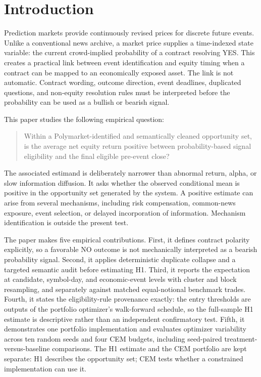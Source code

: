 \documentclass[sigconf,anonymous]{acmart}
\begin{document}
\section{Introduction}

Prediction markets provide continuously revised prices for discrete future events. Unlike a conventional news archive, a market price supplies a time-indexed state variable: the current crowd-implied probability of a contract resolving YES. This creates a practical link between event identification and equity timing when a contract can be mapped to an economically exposed asset. The link is not automatic. Contract wording, outcome direction, event deadlines, duplicated questions, and non-equity resolution rules must be interpreted before the probability can be used as a bullish or bearish signal.

This paper studies the following empirical question:

\begin{quote}
Within a Polymarket-identified and semantically cleaned opportunity set, is the average net equity return positive between probability-based signal eligibility and the final eligible pre-event close?
\end{quote}

The associated estimand is deliberately narrower than abnormal return, alpha, or slow information diffusion. It asks whether the observed conditional mean is positive in the opportunity set generated by the system. A positive estimate can arise from several mechanisms, including risk compensation, common-news exposure, event selection, or delayed incorporation of information. Mechanism identification is outside the present test.

The paper makes five empirical contributions. First, it defines contract polarity explicitly, so a favorable NO outcome is not mechanically interpreted as a bearish probability signal. Second, it applies deterministic duplicate collapse and a targeted semantic audit before estimating H1. Third, it reports the expectation at candidate, symbol-day, and economic-event levels with cluster and block resampling, and separately against matched equal-notional benchmark trades. Fourth, it states the eligibility-rule provenance exactly: the entry thresholds are outputs of the portfolio optimizer's walk-forward schedule, so the full-sample H1 estimate is descriptive rather than an independent confirmatory test. Fifth, it demonstrates one portfolio implementation and evaluates optimizer variability across ten random seeds and four CEM budgets, including seed-paired treatment-versus-baseline comparisons. The H1 estimate and the CEM portfolio are kept separate: H1 describes the opportunity set; CEM tests whether a constrained implementation can use it.
\end{document}
